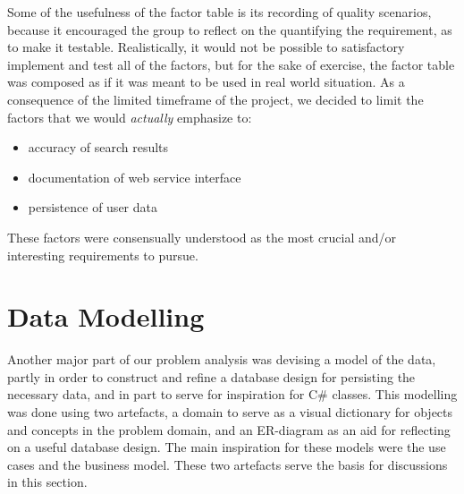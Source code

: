 Some of the usefulness of the factor table is its recording of quality scenarios, because it encouraged the group to reflect on the quantifying the requirement, as to make it testable. Realistically, it would not be possible to satisfactory implement and test all of the factors, but for the sake of exercise, the factor table was composed as if it was meant to be used in  real world situation. As a consequence of the limited timeframe of the project, we decided to limit the factors that we would \textit{actually} emphasize to:
\begin{itemize}
\item accuracy of search results
\item documentation of web service interface
\item persistence of user data
\end{itemize}

These factors were consensually understood as the most crucial and/or interesting requirements to pursue.

\section{Data Modelling}
Another major part of our problem analysis was devising a model of the data, partly in order to construct and refine a database design for persisting the necessary data, and in part to serve for inspiration for C\# classes.
This modelling was done using two artefacts, a domain to serve as a visual dictionary for objects and concepts in the problem domain, and an ER-diagram as an aid for reflecting on a useful database design. The main inspiration for these models were the use cases and the business model. These two artefacts serve the basis for discussions in this section.
